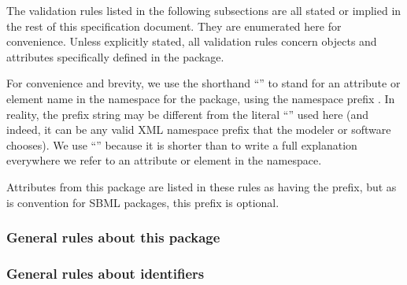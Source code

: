 The validation rules listed in the following subsections are all stated
or implied in the rest of this specification document. They are
enumerated here for convenience. Unless explicitly stated, all
validation rules concern objects and attributes specifically defined in
the \SpatialProcessesPackage package.

For \notice convenience and brevity, we use the shorthand
``'' to stand for an attribute or element name
 in the namespace for the \SpatialProcessesPackage package,
using the namespace prefix . In reality, the prefix
string may be different from the literal ``'' used here
(and indeed, it can be any valid XML namespace prefix that the modeler
or software chooses). We use ``'' because it is
shorter than to write a full explanation everywhere we refer to an
attribute or element in the \SpatialProcessesPackage namespace.

Attributes from this package are listed in these rules as having the  prefix, but as is convention for SBML packages, this prefix is optional.


\subsubsection*{General rules about this package}



\subsubsection*{General rules about identifiers}

